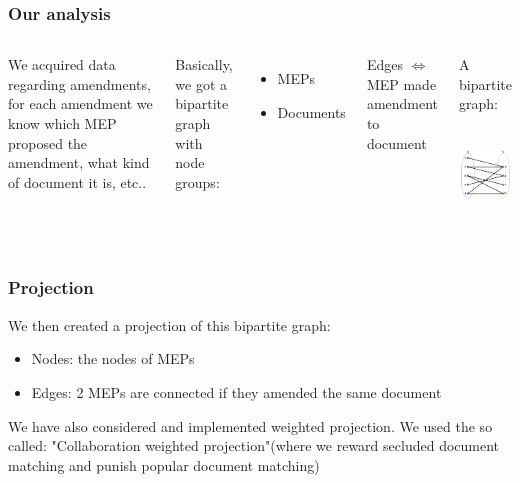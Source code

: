 \documentclass{beamer}
\begin{document}
\begin{frame}
\frametitle{Our analysis}

\begin{columns}

\column{5cm}

We acquired data regarding amendments, for each amendment we know which MEP proposed the amendment, what kind of document it is, etc..
\bigskip

\pause Basically, we got a bipartite graph with node groups:
\begin{itemize}
	\item MEPs
	\item Documents
\end{itemize}
\bigskip

\pause Edges $\iff$ MEP made amendment to document

\pause \column{5cm}
\begin{center}
\small{A bipartite graph:}
\bigskip
\includegraphics[height=3.2cm]{BipartiteGraph.png}
\end{center} 

\end{columns}
\end{frame}



\begin{frame}
\frametitle{Projection}

We then created a projection of this bipartite graph:

\begin{itemize}
	\pause \item Nodes: the nodes of MEPs
	\pause \item Edges: 2 MEPs are connected if they amended the same document	
\end{itemize}

\pause We have also considered and implemented weighted projection. We used the so called: "Collaboration weighted projection"(where we reward secluded document matching and punish popular document matching)

\end{frame}
\end{document}
